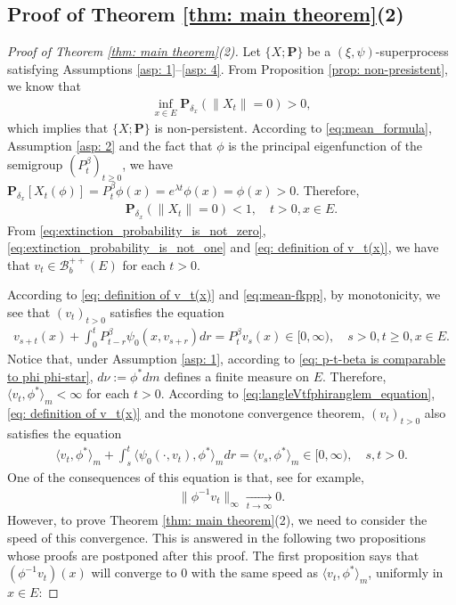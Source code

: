 \documentclass[12pt,a4paper]{amsart}
\theoremstyle{definition}
\numberwithin{equation}{section}
\begin{document}
\subsection{Proof of Theorem \ref{thm: main theorem}(2)}
\label{sec: proof of result 2}
\begin{proof}
  [Proof of Theorem \ref{thm: main theorem}(2)]
  Let $\{X; \mathbf P\}$ be a $(\xi, \psi)$-superprocess satisfying
  Assumptions \ref{asp: 1}--\ref{asp: 4}.
  From Proposition \ref{prop: non-presistent}, we know that 
  \begin{align}
    \label{eq:extinction_probability_is_not_zero}
    \inf_{x\in E} \mathbf P_{\delta_x}(\|X_t\| = 0)
    > 0,
  \end{align}
  which implies that $\{X; \mathbf P\}$ is non-persistent.
  According to \eqref{eq:mean_formula}, Assumption \ref{asp: 2} and the fact that $\phi$ is the principal eigenfunction of the semigroup $(P_t^\beta)_{t\geq 0}$, we have $\mathbf P_{\delta_x}[X_t(\phi)] = P_t^\beta \phi(x) = e^{\lambda t} \phi(x)= \phi(x)>0$.
  Therefore,
  \begin{align}
    \label{eq:extinction_probability_is_not_one}
    \mathbf P_{\delta_x}(\|X_t\|= 0)<1,
    \quad t>0, x \in E.
  \end{align}
  From \eqref{eq:extinction_probability_is_not_zero}, \eqref{eq:extinction_probability_is_not_one} and \eqref{eq: definition of v_t(x)}, we have that $v_t \in \mathscr B^{++}_b(E)$ for each $t > 0$.

  According to \eqref{eq: definition of v_t(x)} and \eqref{eq:mean-fkpp}, by monotonicity, we see that $(v_t)_{t > 0}$ satisfies the equation
  \begin{align}
    v_{s+t}(x) + \int_0^t P^\beta_{t-r} \psi_0(x,v_{s+r}) dr
    = P^\beta_t v_s(x)
    \in [0,\infty),
    \quad s>0, t \geq 0,x \in E.
  \end{align}
  Notice that, under Assumption \ref{asp: 1}, according to \eqref{eq: p-t-beta is comparable to phi phi-star}, $d\nu:= \phi^* dm$ defines a finite measure on $E$.
  Therefore, $\langle v_t, \phi^*\rangle_m < \infty$ for each $t>0$.
  According to \eqref{eq:langleVtfphiranglem_equation}, \eqref{eq: definition of v_t(x)} and the monotone convergence theorem, $(v_t)_{t> 0}$ also satisfies the equation
  \begin{align}
    \label{eq: equation of <vt,phi>}
    \langle v_t,\phi^*\rangle_m + \int_s^t \langle \psi_0(\cdot ,v_t) , \phi^*\rangle_m dr
    = \langle v_s,\phi^*\rangle_m
    \in [0,\infty),
    \quad s, t > 0.
  \end{align}
  One of the consequences of this equation is that, see \cite[Lemma 5.2]{RenSongSun2017Spine} for example,
  \begin{align}
    \label{eq: uniform converges to 0}
    \|\phi^{-1}v_t\|_{\infty} \xrightarrow[t\to \infty]{} 0.
  \end{align}
  However, to prove Theorem \ref{thm: main theorem}(2), we need to consider the speed of this convergence.
  This is answered in the following two propositions whose proofs are postponed after this proof.
  The first proposition says that $(\phi^{-1}v_t)(x)$ will converge to $0$ with the same speed as $\langle v_t,\phi^*\rangle_m$, uniformly in $x\in E$:


\end{proof}
\end{document}
